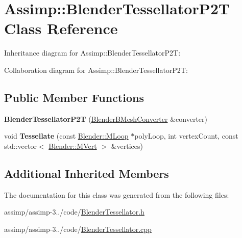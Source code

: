 \hypertarget{class_assimp_1_1_blender_tessellator_p2_t}{\section{Assimp\+:\+:Blender\+Tessellator\+P2\+T Class Reference}
\label{class_assimp_1_1_blender_tessellator_p2_t}
}


Inheritance diagram for Assimp\+:\+:Blender\+Tessellator\+P2\+T\+:


Collaboration diagram for Assimp\+:\+:Blender\+Tessellator\+P2\+T\+:
\subsection*{Public Member Functions}
\begin{DoxyCompactItemize}
\item 
\hypertarget{class_assimp_1_1_blender_tessellator_p2_t_a1a952bff33e39aa00ed610abf1bf698a}{{\bfseries Blender\+Tessellator\+P2\+T} (\hyperlink{class_assimp_1_1_blender_b_mesh_converter}{Blender\+B\+Mesh\+Converter} \&converter)}\label{class_assimp_1_1_blender_tessellator_p2_t_a1a952bff33e39aa00ed610abf1bf698a}

\item 
\hypertarget{class_assimp_1_1_blender_tessellator_p2_t_a165d00aa9b2135fc0f0db4eb8b608abc}{void {\bfseries Tessellate} (const \hyperlink{struct_assimp_1_1_blender_1_1_m_loop}{Blender\+::\+M\+Loop} $\ast$poly\+Loop, int vertex\+Count, const std\+::vector$<$ \hyperlink{struct_assimp_1_1_blender_1_1_m_vert}{Blender\+::\+M\+Vert} $>$ \&vertices)}\label{class_assimp_1_1_blender_tessellator_p2_t_a165d00aa9b2135fc0f0db4eb8b608abc}

\end{DoxyCompactItemize}
\subsection*{Additional Inherited Members}


The documentation for this class was generated from the following files\+:\begin{DoxyCompactItemize}
\item 
assimp/assimp-\/3../code/\hyperlink{_blender_tessellator_8h}{Blender\+Tessellator.\+h}\item 
assimp/assimp-\/3../code/\hyperlink{_blender_tessellator_8cpp}{Blender\+Tessellator.\+cpp}\end{DoxyCompactItemize}
